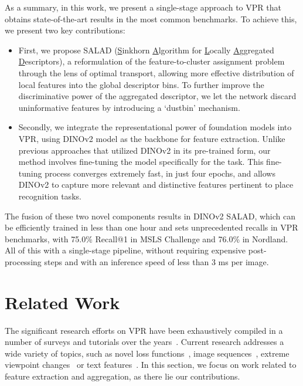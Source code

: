 \documentclass[10pt,twocolumn,letterpaper]{article}
\begin{document}
As a summary, in this work, we present a single-stage approach to VPR that obtains state-of-the-art results in the most common benchmarks. To achieve this, we present two key contributions:

\begin{itemize}
\item First, we propose SALAD (\underline{S}inkhorn \underline{A}lgorithm for \underline{L}ocally \underline{A}ggregated \underline{D}escriptors), a reformulation of the feature-to-cluster assignment problem through the lens of optimal transport, allowing more effective distribution of local features into the global descriptor bins. To further improve the discriminative power of the aggregated descriptor, we let the network discard uninformative features by introducing a `dustbin' mechanism.

\item Secondly, we integrate the representational power of foundation models into VPR, using DINOv2 model as the backbone for feature extraction. Unlike previous approaches that utilized DINOv2 in its pre-trained form, our method involves fine-tuning the model specifically for the task. This fine-tuning process converges extremely fast, in just four epochs, and allows DINOv2 to capture more relevant and distinctive features pertinent to place recognition tasks. 
\end{itemize}

The fusion of these two novel components results in DINOv2 SALAD, which can be efficiently trained in less than one hour and sets unprecedented recalls in VPR benchmarks, with 75.0\% Recall@1 in MSLS Challenge and 76.0\% in Nordland. All of this with a single-stage pipeline, without requiring expensive post-processing steps and with an inference speed of less than 3 ms per image.
 \section{Related Work}
\label{sec:related}

The significant research efforts on VPR have been exhaustively compiled in a number of surveys and tutorials over the years~\cite{lowry2015visual,zhang2021visual,masone2021survey,garg2021your,Schubert2023vpr}. Current research addresses a wide variety of topics, such as novel loss functions~\cite{berton2022rethinking,leyva2023data}, image sequences~\cite{warburg2020mapillary,garg2022seqmatchnet}, extreme viewpoint changes~\cite{lin2015learning} or text features~\cite{hong2019textplace}. In this section, we focus on work related to feature extraction and aggregation, as there lie our contributions. 
\end{document}
